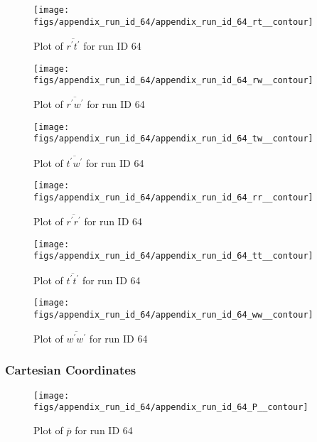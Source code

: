 \begin{figure}[H]
\centering
\texttt{[image: figs/appendix\_run\_id\_64/appendix\_run\_id\_64\_rt\_\_contour]}
\caption{Plot of $\overline{r^\prime t^\prime}$ for run ID 64}
\label{fig:appendix_run_id_64_rt__contour}
\end{figure}


\begin{figure}[H]
\centering
\texttt{[image: figs/appendix\_run\_id\_64/appendix\_run\_id\_64\_rw\_\_contour]}
\caption{Plot of $\overline{r^\prime w^\prime}$ for run ID 64}
\label{fig:appendix_run_id_64_rw__contour}
\end{figure}


\begin{figure}[H]
\centering
\texttt{[image: figs/appendix\_run\_id\_64/appendix\_run\_id\_64\_tw\_\_contour]}
\caption{Plot of $\overline{t^\prime w^\prime}$ for run ID 64}
\label{fig:appendix_run_id_64_tw__contour}
\end{figure}


\begin{figure}[H]
\centering
\texttt{[image: figs/appendix\_run\_id\_64/appendix\_run\_id\_64\_rr\_\_contour]}
\caption{Plot of $\overline{r^\prime r^\prime}$ for run ID 64}
\label{fig:appendix_run_id_64_rr__contour}
\end{figure}


\begin{figure}[H]
\centering
\texttt{[image: figs/appendix\_run\_id\_64/appendix\_run\_id\_64\_tt\_\_contour]}
\caption{Plot of $\overline{t^\prime t^\prime}$ for run ID 64}
\label{fig:appendix_run_id_64_tt__contour}
\end{figure}


\begin{figure}[H]
\centering
\texttt{[image: figs/appendix\_run\_id\_64/appendix\_run\_id\_64\_ww\_\_contour]}
\caption{Plot of $\overline{w^\prime w^\prime}$ for run ID 64}
\label{fig:appendix_run_id_64_ww__contour}
\end{figure}


\subsubsection{Cartesian Coordinates}
\begin{figure}[H]
\centering
\texttt{[image: figs/appendix\_run\_id\_64/appendix\_run\_id\_64\_P\_\_contour]}
\caption{Plot of $\overline{p}$ for run ID 64}
\label{fig:appendix_run_id_64_P__contour}
\end{figure}


